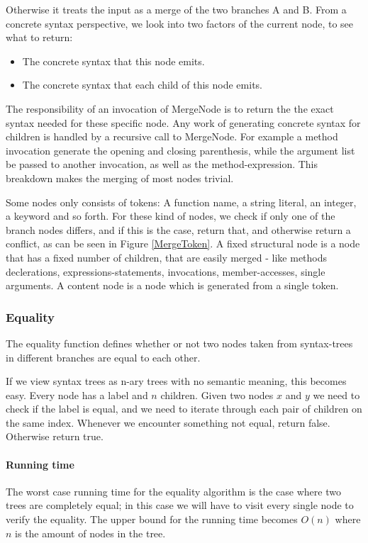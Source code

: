 \documentclass[11pt]{article}
\begin{document}
Otherwise it treats the input as a merge of the two branches A and B. From a concrete syntax perspective, we look into two factors of the current node, to see what to return:

\begin{itemize}
   \item The concrete syntax that this node emits.
   \item The concrete syntax that each child of this node emits.
\end{itemize}

The responsibility of an invocation of MergeNode is to return the the exact syntax needed for these specific node. Any work of generating concrete syntax for children is handled by a recursive call to MergeNode. For example a method invocation generate the opening and closing parenthesis, while the argument list be passed to another invocation, as well as the method-expression. This breakdown makes the merging of most nodes trivial.

Some nodes only consists of tokens: A function name, a string literal, an integer, a keyword and so forth. For these kind of nodes, we check if only one of the branch nodes differs, and if this is the case, return that, and otherwise return a conflict, as can be seen in Figure \ref{MergeToken}. A fixed structural node is a node that has a fixed number of children, that are easily merged - like methods declerations, expressions-statements, invocations, member-accesses, single arguments. A content node is a node which is generated from a single token.

\subsubsection{Equality}
The equality function defines whether or not two nodes taken from syntax-trees in different branches are equal to each other.

If we view syntax trees as n-ary trees with no semantic meaning, this becomes easy. Every node has a label and $n$ children. Given two nodes $x$ and $y$ we need to check if the label is equal, and we need to iterate through each pair of children on the same index. Whenever we encounter something not equal, return false. Otherwise return true.

\paragraph{Running time} The worst case running time for the equality algorithm is the case where two trees are completely equal; in this case we will have to visit every single node to verify the equality. The upper bound for the running time becomes $O(n)$ where $n$ is the amount of nodes in the tree.
\end{document}
